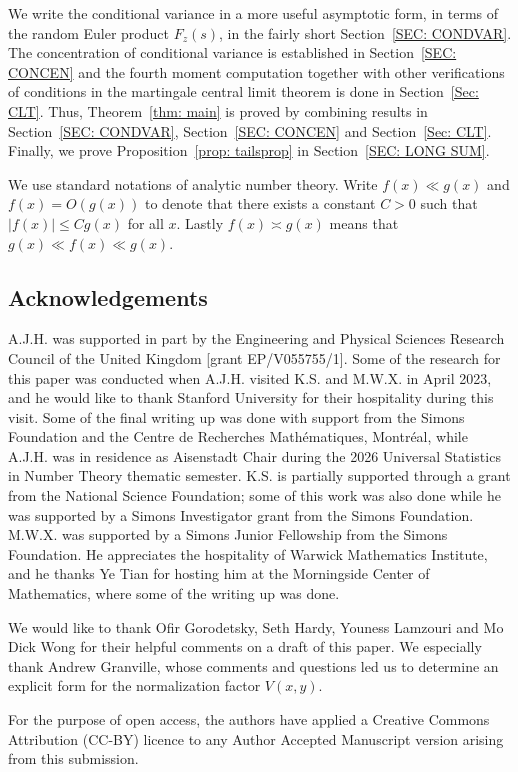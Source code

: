 \documentclass[12pt, notitlepage]{amsart}
\numberwithin{equation}{section}
\theoremstyle{remark}
\theoremstyle{definition}
\theoremstyle{remark}
\numberwithin{equation}{section}
\begin{document}
We write the conditional variance in a more useful asymptotic form, in terms of the random Euler product $F_z(s)$, in the fairly short Section~\ref{SEC: CONDVAR}. The concentration of conditional variance is established in Section~\ref{SEC: CONCEN} and the fourth moment computation together with other verifications of conditions in the martingale central limit theorem is done in Section~\ref{Sec: CLT}. Thus, Theorem~\ref{thm: main} is proved by combining results in Section~\ref{SEC: CONDVAR}, Section~\ref{SEC: CONCEN} and Section~\ref{Sec: CLT}.  Finally, we prove Proposition~\ref{prop: tailsprop} in Section~\ref{SEC: LONG SUM}.

We use standard notations of analytic number theory. Write $f(x)\ll g(x)$ and $f(x) =O(g(x))$ to denote that there exists a constant $C>0$ such that $|f(x)|\le Cg(x)$ for all $x$. Lastly  $f(x)\asymp g(x)$ means that $g(x)\ll f(x)\ll g(x)$.

\subsection*{Acknowledgements}
A.J.H. was supported in part by the Engineering and Physical Sciences Research Council of the United Kingdom [grant EP/V055755/1]. Some of the research for this paper was conducted when A.J.H. visited K.S. and M.W.X. in April 2023, and he would like to thank Stanford University for their hospitality during this visit. Some of the final writing up was done with support from the Simons Foundation and the Centre de Recherches Math\'ematiques, Montr\'eal, while A.J.H. was in residence as Aisenstadt Chair during the 2026 Universal Statistics in Number Theory thematic semester. K.S. is partially supported through a grant from the National Science Foundation; some of this work was also done while he was supported by a Simons Investigator grant from the Simons Foundation.  M.W.X. was supported by a Simons Junior Fellowship from the Simons Foundation. He appreciates the hospitality of Warwick Mathematics Institute, and he thanks Ye Tian for hosting him at the Morningside Center of Mathematics, where some of the writing up was done.  

We would like to thank Ofir Gorodetsky, Seth Hardy, Youness Lamzouri and Mo Dick Wong for their helpful comments on a draft of this paper. We especially thank Andrew Granville, whose comments and questions led us to determine an explicit form for the normalization factor $V(x,y)$.

For the purpose of open access, the authors have applied a Creative Commons Attribution (CC-BY) licence to any Author Accepted Manuscript version arising from this submission.
\end{document}
